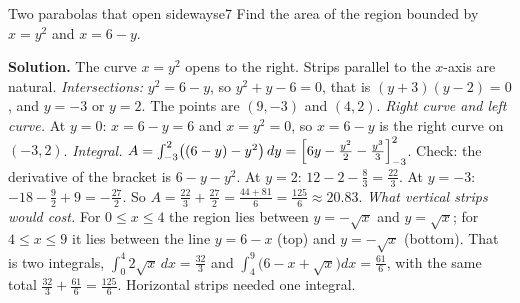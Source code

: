 \documentclass[11pt]{article}
\begin{document}
\begin{exmp}{Two parabolas that open sideways}{e7}
Find the area of the region bounded by $x=y^2$ and $x=6-y$.

\textbf{Solution.} The curve $x=y^2$ opens to the right. Strips parallel to the $x$-axis are natural. \emph{Intersections:} $y^2=6-y$, so $y^2+y-6=0$, that is $(y+3)(y-2)=0$, and $y=-3$ or $y=2$. The points are $(9,-3)$ and $(4,2)$.
\emph{Right curve and left curve.} At $y=0$: $x=6-y=6$ and $x=y^2=0$, so $x=6-y$ is the right curve on $(-3,2)$.
\emph{Integral.} $A=\int_{-3}^{2}\bigl((6-y)-y^2\bigr)\,dy=\Bigl[6y-\frac{y^2}2-\frac{y^3}3\Bigr]_{-3}^{2}$. Check: the derivative of the bracket is $6-y-y^2$. At $y=2$: $12-2-\frac83=\frac{22}3$. At $y=-3$: $-18-\frac92+9=-\frac{27}2$. So $A=\frac{22}3+\frac{27}2=\frac{44+81}6=\frac{125}6\approx20.83$.
\emph{What vertical strips would cost.} For $0\le x\le4$ the region lies between $y=-\sqrt x$ and $y=\sqrt x$; for $4\le x\le9$ it lies between the line $y=6-x$ (top) and $y=-\sqrt x$ (bottom). That is two integrals, $\int_0^4 2\sqrt x\,dx=\frac{32}3$ and $\int_4^9\bigl(6-x+\sqrt x\bigr)dx=\frac{61}6$, with the same total $\frac{32}3+\frac{61}6=\frac{125}6$. Horizontal strips needed one integral.


\end{exmp}
\end{document}
